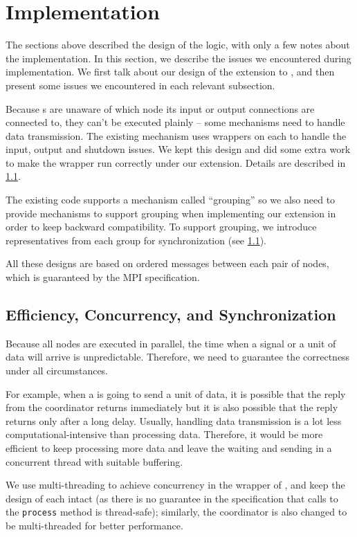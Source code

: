 \section{Implementation}
The sections above described the design of the logic, with only a few notes about the implementation. In this section, we describe the issues we encountered during implementation. We first talk about our design of the extension to \dpy, and then present some issues we encountered in each relevant subsection.

Because \tPEInst{}s are unaware of which node its input or output connections are connected to, they can't be executed plainly -- some mechanisms need to handle data transmission. The existing \dpy mechanism uses wrappers on each \tPEInst to handle the input, output and shutdown issues. We kept this design and did some extra work to make the wrapper run correctly under our extension. Details are described in \ref{ssec:incdep_ecs}.

The existing \dpy code supports a mechanism called ``grouping'' so we also need to provide mechanisms to support grouping when implementing our extension in order to keep backward compatibility. To support grouping, we introduce representatives from each group for synchronization (see \ref{ssec:incdep_ecs}).

All these designs are based on ordered messages between each pair of nodes, which is guaranteed by the MPI specification.

\subsection{Efficiency, Concurrency, and Synchronization} \label{ssec:incdep_ecs}
Because all nodes are executed in parallel, the time when a signal or a unit of data will arrive is unpredictable. Therefore, we need to guarantee the correctness under all circumstances. 

For example, when a \tPEInst is going to send a unit of data, it is possible that the reply from the coordinator returns immediately but it is also possible that the reply returns only after a long delay. Usually, handling data transmission is a lot less computational-intensive than processing data. Therefore, it would be more efficient to keep processing more data and leave the waiting and sending in a concurrent thread with suitable buffering.

We use multi-threading to achieve concurrency in the wrapper of \tPEInst, and keep the design of each \tPEInst intact (as there is no guarantee in the specification that calls to the \lstinline|process| method is thread-safe); similarly, the coordinator is also changed to be multi-threaded for better performance.

